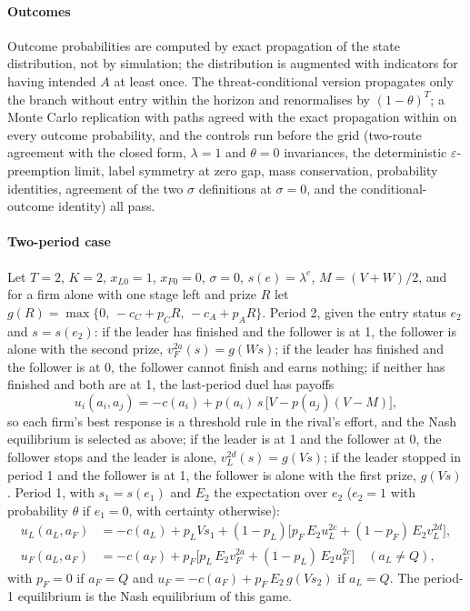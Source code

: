 \documentclass[preprint,12pt,authoryear]{elsarticle}
\begin{document}
\paragraph{Outcomes} Outcome probabilities are computed by exact propagation of the state distribution, not by simulation; the distribution is augmented with indicators for having intended $A$ at least once. The threat-conditional version propagates only the branch without entry within the horizon and renormalises by $(1-\theta)^{T}$; a Monte Carlo replication with \MCPaths{} paths agreed with the exact propagation within \MCMaxDiff{} on every outcome probability, and the \ModelControlsCount{} controls run before the grid (two-route agreement with the closed form, $\lambda = 1$ and $\theta = 0$ invariances, the deterministic $\varepsilon$-preemption limit, label symmetry at zero gap, mass conservation, probability identities, agreement of the two $\sigma$ definitions at $\sigma = 0$, and the conditional-outcome identity) all pass.

\paragraph{Two-period case} Let $T = 2$, $K = 2$, $x_{L0} = 1$, $x_{F0} = 0$, $\sigma = 0$, $s(e) = \lambda^{e}$, $M = (V+W)/2$, and for a firm alone with one stage left and prize $R$ let $g(R) = \max\{0,\, -c_C + p_C R,\, -c_A + p_A R\}$. Period 2, given the entry status $e_2$ and $s = s(e_2)$: if the leader has finished and the follower is at 1, the follower is alone with the second prize, $v_F^{2a}(s) = g(Ws)$; if the leader has finished and the follower is at 0, the follower cannot finish and earns nothing; if neither has finished and both are at 1, the last-period duel has payoffs
\begin{equation}
u_i(a_i, a_j) = -c(a_i) + p(a_i)\, s\,\bigl[V - p(a_j)(V - M)\bigr],
\end{equation}
so each firm's best response is a threshold rule in the rival's effort, and the Nash equilibrium is selected as above; if the leader is at 1 and the follower at 0, the follower stops and the leader is alone, $v_L^{2d}(s) = g(Vs)$; if the leader stopped in period 1 and the follower is at 1, the follower is alone with the first prize, $g(Vs)$. Period 1, with $s_1 = s(e_1)$ and $E_2$ the expectation over $e_2$ ($e_2 = 1$ with probability $\theta$ if $e_1 = 0$, with certainty otherwise):
\begin{align}
u_L(a_L, a_F) &= -c(a_L) + p_L V s_1 + (1 - p_L)\bigl[p_F\, E_2 u_L^{2c} + (1 - p_F)\, E_2 v_L^{2d}\bigr], \\
u_F(a_L, a_F) &= -c(a_F) + p_F\bigl[p_L\, E_2 v_F^{2a} + (1 - p_L)\, E_2 u_F^{2c}\bigr] \quad (a_L \neq Q),
\end{align}
with $p_F = 0$ if $a_F = Q$ and $u_F = -c(a_F) + p_F\, E_2\, g(Vs_2)$ if $a_L = Q$. The period-1 equilibrium is the Nash equilibrium of this game.
\end{document}
